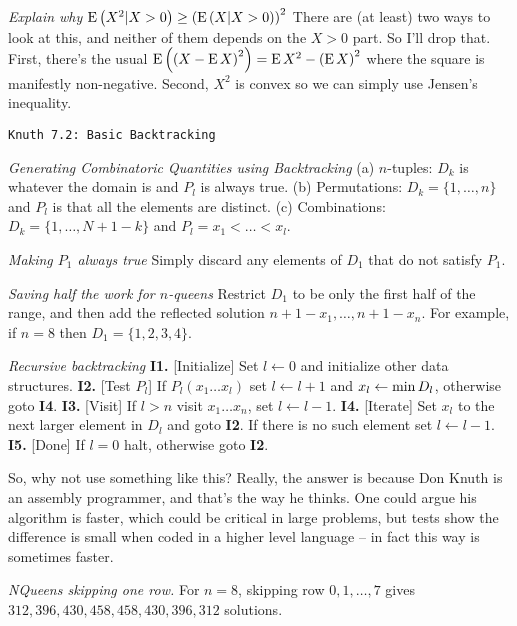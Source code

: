  {\it Explain why ${\rm E}\left(X^2 | X > 0\right) \geq 
\left({\rm E} \left(X | X > 0\right)\right)^2$}\hfil\break
There are (at least) two ways to look at this, and neither of them depends on the $X > 0$
part.  So I'll drop that.  First, there's the usual ${\rm E}\left( \left(X - {\rm E} \, X\right)^2 \right) =
{\rm E} \, X^2 - \left({\rm E}\, X\right)^2$ where the square is manifestly non-negative.
Second, $X^2$ is convex so we can simply use Jensen's inequality.

\topglue 0.5in
\centerline{\tt Knuth 7.2: Basic Backtracking}
\vskip 0.3in


 {\it Generating Combinatoric Quantities using 
Backtracking}\hfil\break
(a) $n$-tuples: $D_k$ is whatever the domain is and $P_l$ is always 
true.\hfil\break 
(b) Permutations: $D_k = \{ 1, \ldots, n \}$ and $P_l$ is that all the elements 
are distinct.\hfil\break
(c) Combinations: $D_k = \{1, \ldots, N + 1 - k \}$ and 
$P_l = x_1 < \ldots < x_l$.\hfil\break

 {\it Making $P_1$ always true}\hfil\break
Simply discard any elements of $D_1$ that do not satisfy $P_1$.

 {\it Saving half the work for $n$-queens}\hfil\break
Restrict $D_1$ to be only the first half of the range, and then add the 
reflected solution $n + 1 - x_1, \ldots, n + 1 - x_n$.  For example, if $n = 8$
then $D_1 = \{1, 2, 3, 4\}$.

 {\it Recursive backtracking}\hfil\break
{\bf I1.} [Initialize] Set $l \leftarrow 0$ and initialize other data 
structures.\hfil\break
{\bf I2.} [Test $P_l$] If $P_l\left(x_1 \ldots x_l\right)$ set 
 $l \leftarrow l + 1$ and $x_l \leftarrow {\rm min}\,D_l$,
  otherwise goto {\bf I4}.\hfil\break 
{\bf I3.} [Visit] If $l > n$ visit $x_1 \ldots x_n$, set $l \leftarrow l-1$.
\hfil\break
{\bf I4.} [Iterate] Set $x_l$ to the next larger element in $D_l$ and goto 
 {\bf I2}. If there is no such element set $l \leftarrow l - 1$.\hfil\break
{\bf I5.} [Done] If $l=0$ halt, otherwise goto {\bf I2}.
\hfil\break

So, why not use something like this?  Really, the answer is because Don Knuth
is an assembly programmer, and that's the way he thinks.  One could argue his
algorithm is faster, which could be critical in large problems, but tests show
the difference is small when coded in a higher level language -- in fact this
way is sometimes faster.

 {\it NQueens skipping one row.}\hfil\break
For $n=8$, skipping row $0, 1, \ldots, 7$ gives ${312, 396,
430, 458, 458, 430, 396, 312}$ solutions.

